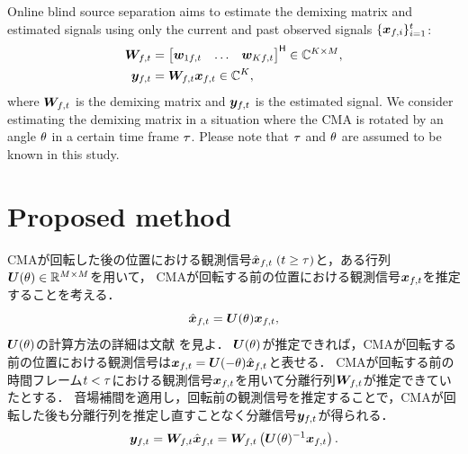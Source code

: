 \documentclass[sip,biber]{now-journal}
\begin{document}
Online blind source separation aims to estimate the demixing matrix and estimated signals using only the current and past observed signals $\{\bm{x} _{f,i}\} _{i=1} ^{t}$:
\begin{align}
  \Demix _{\ft} &= \begin{bmatrix} \demix _{1\ft} & \dots & \demix _{\Src\ft} \end{bmatrix} ^{\hermite} \in \C ^{\Src \times \Mic}, \\
  \Est _{\ft} &= \Demix _{\ft} \Obs _{\ft} \in \C ^{\Src},
\end{align}
where $\Demix _{\ft}$ is the demixing matrix and $\Est _{\ft}$ is the estimated signal.
We consider estimating the demixing matrix in a situation where the CMA is rotated by an angle $\theta$ in a certain time frame $\tau$.
Please note that $\tau$ and $\theta$ are assumed to be known in this study.%

\section{Proposed method}

CMAが回転した後の位置における観測信号$\rotObs _{\ft}\; (\tframe \geq \rotFra)$と，ある行列$\bm{U} (\theta) \in \mathbb{R} ^{M\times M}$を用いて，
CMAが回転する前の位置における観測信号$\Obs _{\ft}$を推定することを考える．
\begin{equation}
  \rot{\Obs} _{\ft} = \rotMat (\rotDeg) \Obs _{\ft},
\end{equation}
$\bm{U} (\theta)$の計算方法の詳細は文献 \cite{Wakabayashi:2020:ASJ:A} を見よ．
$\bm{U} (\theta)$が推定できれば，CMAが回転する前の位置における観測信号は$\Obs _{\ft} = \rotMat (-\rotDeg) \rot{\Obs} _{\ft}$と表せる．
CMAが回転する前の時間フレーム$t < \tau$における観測信号$\Obs _{\ft}$を用いて分離行列$\Demix _{\ft}$が推定できていたとする．
音場補間を適用し，回転前の観測信号を推定することで，CMAが回転した後も分離行列を推定し直すことなく分離信号$\Est _{\ft}$が得られる．
\begin{equation}
  \Est _{\ft} = \Demix _{\ft} \rotObs _{\ft} = \Demix _{\ft} \left(\rotMat (\rotDeg)^{-1} \Obs _{\ft}\right).
\end{equation}
\end{document}
